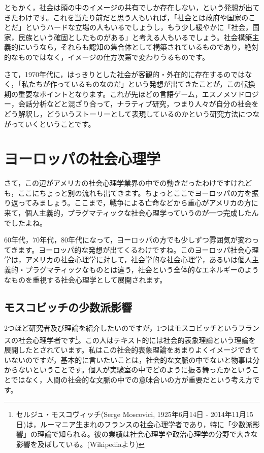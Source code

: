 \documentclass{ltjsbook}
\begin{document}
ともかく，社会は頭の中のイメージの共有でしか存在しない，という発想が出てきたわけです。これを当たり前だと思う人もいれば，「社会とは政府や国家のことだ」というハードな立場の人もいるでしょうし，もう少し緩やかに「社会，国家，民族という確固としたものがある」と考える人もいるでしょう。社会構築主義的にいうなら，それらも認知の集合体として構築されているものであり，絶対的なものではなく，イメージの仕方次第で変わりうるものです。

さて，1970年代に，はっきりとした社会が客観的・外在的に存在するのではなく，「私たちが作っているものなのだ」という発想が出てきたことが，この転換期の重要なポイントとなります。これが先ほどの言語ゲーム，エスノメソドロジー，会話分析などと混ざり合って，ナラティブ研究，つまり人々が自分の社会をどう解釈し，どういうストーリーとして表現しているのかという研究方法につながっていくということです。

\section{ヨーロッパの社会心理学}
さて，この辺がアメリカの社会心理学業界の中での動きだったわけですけれども，ここにちょっと別の流れも出てきます。ちょっとここでヨーロッパの方を振り返ってみましょう。ここまで，戦争による亡命などから重心がアメリカの方に来て，個人主義的，プラグマティックな社会心理学っていうのが一つ完成したんでしたよね。

60年代，70年代，80年代になって，ヨーロッパの方でも少しずつ雰囲気が変わってきます。ヨーロッパ的な発想が出てくるわけですね。このヨーロッパ社会心理学は，アメリカの社会心理学に対して，社会学的な社会心理学，あるいは個人主義的・プラグマティックなものとは違う，社会という全体的なエネルギーのようなものを重視する社会心理学として展開されます。
\subsection{モスコビッチの少数派影響}
2つほど研究者及び理論を紹介したいのですが，1つはモスコビッチというフランスの社会心理学者です\footnote{セルジュ・モスコヴィッチ(Serge Moscovici, 1925年6月14日 - 2014年11月15日)は，ルーマニア生まれのフランスの社会心理学者であり，特に「少数派影響」の理論で知られる。彼の業績は社会心理学や政治心理学の分野で大きな影響を及ぼしている。(Wikipediaより)}。この人はテキスト的には社会的表象理論という理論を展開したとされています。私はこの社会的表象理論をあまりよくイメージできていないのですが，基本的に言いたいことは，社会的な文脈の中でないと物事は分からないということです。個人が実験室の中でどのように振る舞ったかということではなく，人間の社会的な文脈の中での意味合いの方が重要だという考え方です。
\end{document}
